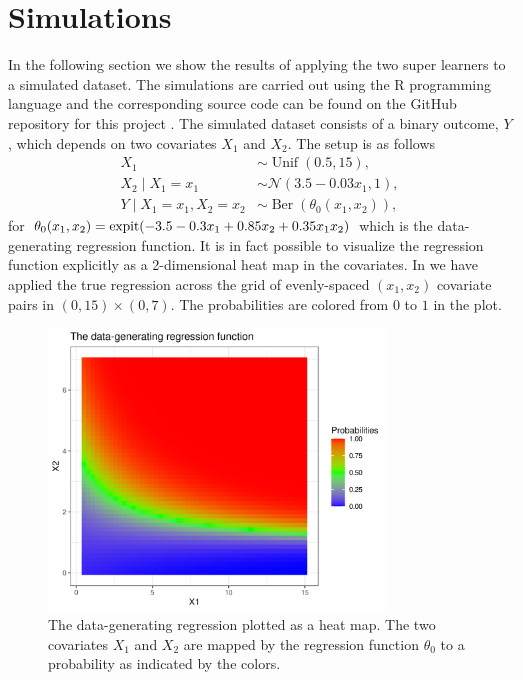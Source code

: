 \documentclass[./main.tex]{subfiles}
\begin{document}
\section{Simulations} \label{sec:simulations}
In the following section we show the results of applying the two super learners to a simulated dataset. The simulations are carried out using the R programming language and the corresponding source code can be found on the GitHub repository for this project \parencite{github}. The simulated dataset consists of a binary outcome, $Y$, which depends on two covariates $X_1$ and $X_2$. The setup is as follows
\begin{align*}
    X_1 &\sim \operatorname{Unif}(0.5, 15),\\
    X_2 \mid X_1 = x_1 &\sim \mathcal{N}(3.5-0.03x_1, 1),\\
    Y \mid X_1 = x_1, X_2 = x_2 &\sim \operatorname{Ber}(\theta_0(x_1, x_2)),
\end{align*}
for $\theta_0(x_1, x_2) = \operatorname{expit}({-3.5 - 0.3x_1 + 0.85x_2 + 0.35x_1x_2})$ which is the data-generating regression function. It is in fact possible to visualize the regression function explicitly as a 2-dimensional heat map in the covariates. In  we have applied the true regression across the grid of evenly-spaced $ (x_1, x_2) $ covariate pairs in $ (0, 15) \times (0,7) $. The probabilities are colored from $ 0 $ to $ 1 $ in the plot. 
\begin{figure}[H]
    \centering
    \includegraphics[width=0.8\textwidth]{figures/trueplot.png}
    \caption{The data-generating regression plotted as a heat map. The two covariates $ X_1 $ and $ X_2 $ are mapped by the regression function $ \theta_0 $ to a probability as indicated by the colors.}
    \label{fig:trueplot}
\end{figure}
\end{document}
